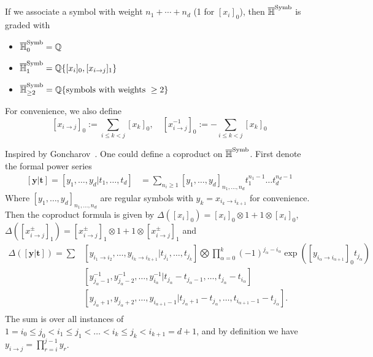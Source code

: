 If we associate a symbol with weight $n_1+\cdots+n_d$ (1 for $[x_i]_0$), then $\overline{\mathbb H}^{\operatorname{Symb}}$ is graded with
\begin{itemize}
\item $\overline{\mathbb H}^{\operatorname{Symb}}_0=\mathbb Q$
\item $\overline{\mathbb H}^{\operatorname{Symb}}_1=\mathbb Q\{[x_i]_0, [x_{i\to j}]_1\}$
\item $\overline{\mathbb H}^{\operatorname{Symb}}_{\geq2}=\mathbb Q\{\text{symbols with weights }\geq2\}$
\end{itemize}

For convenience, we also define
\[
[x_{i\to j}]_0:=\sum_{i\leq k<j}[x_k]_0,\quad [x_{i\to j}^{-1}]_0:=-\sum_{i\leq k<j}[x_k]_0
\]

Inspired by Goncharov~\cite{Goncharov_GaloisSymmetriesOfFundamentalGroupoidsAndNoncommutativeGeometry}. One could define a coproduct on $\overline{\mathbb H}^{\operatorname{Symb}}$. First denote the formal power series
\begin{equation}
\begin{aligned}
[\mathbf y|\mathbf t]=[y_1,\dots,y_d|t_1,\dots,t_d]&=\sum_{n_i\geq 1}[y_1,\dots,y_d]_{n_1,\dots,n_d}t_1^{n_1-1}\dots t_d^{n_d-1}
\end{aligned}
\end{equation}
Where $[y_1,\dots,y_d]_{n_1,\dots,n_d}$ are regular symbols with $y_k=x_{i_k\to i_{k+1}}$ for convenience. Then the coproduct formula is given by $\Delta([x_{i}]_0)=[x_{i}]_0\otimes 1+1\otimes [x_{i}]_0$, $\Delta([x_{i\to j}^{\pm}]_1)=[x_{i\to j}^{\pm}]_1\otimes 1+1\otimes [x_{i\to j}^{\pm}]_1$ and
\begin{equation}\label{eq:GoncharovCoproductFormula}
\begin{aligned}
\Delta([\mathbf y|\mathbf t])=\sum&[y_{i_1\to i_2},\dots,y_{i_k\to i_{k+1}}|t_{j_1},\dots ,t_{j_k}]\bigotimes\prod_{\alpha=0}^k(-1)^{j_\alpha-i_\alpha}\exp([y_{i_\alpha\to i_{\alpha+1}}]_0t_{j_\alpha})\\
&[y_{j_\alpha-1}^{-1},y_{j_\alpha-2}^{-1},\dots,y_{i_\alpha}^{-1}|t_{j_\alpha}-t_{j_\alpha-1},\dots, t_{j_\alpha}-t_{i_\alpha}]\\
&[y_{j_\alpha+1},y_{j_\alpha+2},\dots,y_{i_{\alpha+1}-1}|t_{j_\alpha+1}-t_{j_\alpha},\dots,t_{i_{\alpha+1}-1}-t_{j_\alpha}].\\
\end{aligned}
\end{equation}
The sum is over all instances of $1=i_0\leq j_0<i_1\leq j_1<\dots <i_k\leq j_k<i_{k+1}=d+1$, and by definition we have $y_{i\to j}=\prod_{r=i}^{j-1}y_r$.

